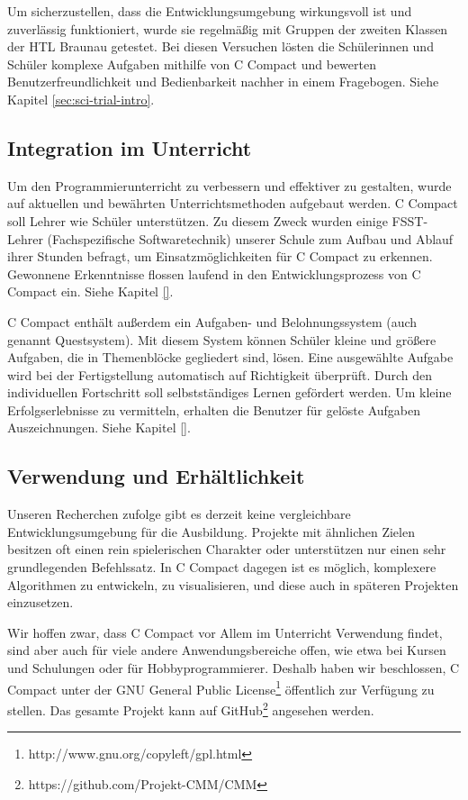 Um sicherzustellen, dass die Entwicklungsumgebung wirkungsvoll ist und zuverlässig funktioniert, wurde sie regelmäßig mit Gruppen der zweiten Klassen der HTL Braunau getestet. Bei diesen Versuchen lösten die Schülerinnen und Schüler komplexe Aufgaben mithilfe von C Compact und bewerten Benutzerfreundlichkeit und Bedienbarkeit nachher in einem Fragebogen. Siehe Kapitel \ref{sec:sci-trial-intro}.

\subsection*{Integration im Unterricht}
Um den Programmierunterricht zu verbessern und effektiver zu gestalten, wurde auf aktuellen und bewährten Unterrichtsmethoden aufgebaut werden. C Compact soll Lehrer wie Schüler unterstützen. Zu diesem Zweck wurden einige FSST-Lehrer (Fachspezifische Softwaretechnik) unserer Schule zum Aufbau und Ablauf ihrer Stunden befragt, um Einsatzmöglichkeiten für C Compact zu erkennen. Gewonnene Erkenntnisse flossen laufend in den Entwicklungsprozess von C Compact ein. Siehe Kapitel \ref{}.

C Compact enthält außerdem ein Aufgaben- und Belohnungssystem (auch genannt Questsystem). Mit diesem System können Schüler kleine und größere Aufgaben, die in Themenblöcke gegliedert sind, lösen. Eine ausgewählte Aufgabe wird bei der Fertigstellung automatisch auf Richtigkeit überprüft. Durch den individuellen Fortschritt soll selbstständiges Lernen gefördert werden. Um kleine Erfolgserlebnisse zu vermitteln, erhalten die Benutzer für gelöste Aufgaben Auszeichnungen. Siehe Kapitel \ref{}.

\subsection*{Verwendung und Erhältlichkeit}
Unseren Recherchen zufolge gibt es derzeit keine vergleichbare Entwicklungsumgebung für die Ausbildung. Projekte mit ähnlichen Zielen besitzen oft einen rein spielerischen Charakter oder unterstützen nur einen sehr grundlegenden Befehlssatz. In C Compact dagegen ist es möglich, komplexere Algorithmen zu entwickeln, zu visualisieren, und diese auch in späteren Projekten einzusetzen.

Wir hoffen zwar, dass C Compact vor Allem im Unterricht Verwendung findet, sind aber auch für viele andere Anwendungsbereiche offen, wie etwa bei Kursen und Schulungen oder für Hobbyprogrammierer. Deshalb haben wir beschlossen, C Compact unter der GNU General Public License\footnote{http://www.gnu.org/copyleft/gpl.html} öffentlich zur Verfügung zu stellen. Das gesamte Projekt kann auf GitHub\footnote{https://github.com/Projekt-CMM/CMM} angesehen werden.

